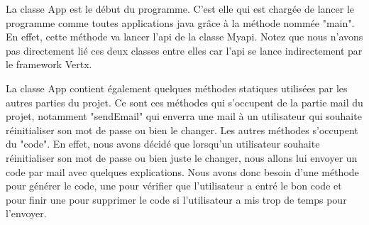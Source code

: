 \begin{flushleft}
La classe App est le début du programme. C'est elle qui est chargée de lancer le programme comme toutes applications java grâce à la méthode nommée "main". En effet, cette méthode va lancer l'api de la classe Myapi. Notez que nous n'avons pas directement lié ces deux classes entre elles car l'api se lance indirectement par le framework Vertx.
\end{flushleft}

\begin{flushleft}
La classe App contient également quelques méthodes statiques utilisées par les autres parties du projet. Ce sont ces méthodes qui s'occupent de la partie mail du projet, notamment "sendEmail" qui enverra une mail à un utilisateur qui souhaite réinitialiser son mot de passe ou bien le changer. Les autres méthodes s'occupent du "code". En effet, nous avons décidé que lorsqu'un utilisateur souhaite réinitialiser son mot de passe ou bien juste le changer, nous allons lui envoyer un code par mail avec quelques explications. Nous avons donc besoin d'une méthode pour générer le code, une pour vérifier que l'utilisateur a entré le bon code et pour finir une pour supprimer le code si l'utilisateur a mis trop de temps pour l'envoyer.
\end{flushleft}